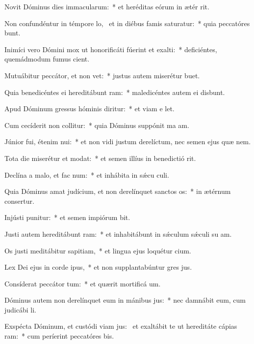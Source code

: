\item Novit Dóminus dies immacularum:~* et heréditas eórum in ætér rit.
\item Non confundéntur in témpore lo,~\pscross{} et in diébus famis saturatur:~* quia peccatóres bunt.
\item Inimíci vero Dómini mox ut honorificáti fúerint et exalti:~* deficiéntes, quemádmodum fumus cient.
\item Mutuábitur peccátor, et non vet:~* justus autem miserétur  buet.
\item Quia benedicéntes ei hereditábunt ram:~* maledicéntes autem ei disbunt.
\item Apud Dóminum gressus hóminis diritur:~* et viam e let.
\item Cum cecíderit non collitur:~* quia Dóminus suppónit ma am.
\item Júnior fui, étenim nui:~* et non vidi justum derelíctum, nec semen ejus quæ nem.
\item Tota die miserétur et modat:~* et semen illíus in benedictió rit.
\item Declína a malo, et fac num:~* et inhábita in sǽcu culi.
\item Quia Dóminus amat judícium, et non derelínquet sanctos os:~* in ætérnum consertur.
\item Injústi punitur:~* et semen impiórum bit.
\item Justi autem hereditábunt ram:~* et inhabitábunt in sǽculum sǽculi su am.
\item Os justi meditábitur sapitiam,~* et lingua ejus loquétur cium.
\item Lex Dei ejus in corde ipus,~* et non supplantabúntur gres jus.
\item Consíderat peccátor tum:~* et quærit mortificá um.
\item Dóminus autem non derelínquet eum in mánibus jus:~* nec damnábit eum, cum judicábi li.
\item Exspécta Dóminum, et custódi viam jus:~\pscross{} et exaltábit te ut hereditáte cápias ram:~* cum períerint peccatóres bis.
